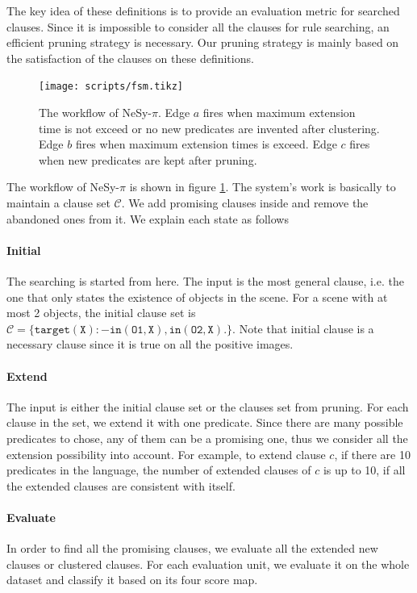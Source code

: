 \documentclass[
]{ceurart}
\begin{document}
The key idea of these definitions is to provide an evaluation metric for searched clauses. Since it is impossible to consider all the clauses for rule searching, an efficient pruning strategy is necessary. Our pruning strategy is mainly based on the satisfaction of the clauses on these definitions. 

\begin{figure}[h]
	\centering
	\texttt{[image: scripts/fsm.tikz]}
	\caption{The workflow of NeSy-$ \pi $. Edge $ a $ fires when maximum extension time is not exceed or no new predicates are invented after clustering. Edge $ b $ fires when maximum extension times is exceed. Edge $ c $ fires when new predicates are kept after pruning.}
	\label{fig:nesy-pi-workflow.}
\end{figure}

The workflow of NeSy-$ \pi $ is shown in figure \ref{fig:nesy-pi-workflow.}. The system's work is basically to maintain a clause set $ \mathcal{C} $. We add promising clauses inside and remove the abandoned ones from it. We explain each state as follows
\paragraph{Initial}
The searching is started from here. The input is the most general clause, i.e. the one that only states the existence of objects in the scene. For a scene with at most 2 objects, the initial clause set is $ \mathcal{C} = \{\mathtt{target(X):-in(O1,X),in(O2,X).} \} $. Note that initial clause is a necessary clause since it is true on all the positive images.

\paragraph{Extend}
The input is either the initial clause set or the clauses set from pruning. For each clause in the set, we extend it with one predicate. Since there are many possible predicates to chose, any of them can be a promising one, thus we consider all the extension possibility into account. For example, to extend clause $ c $, if there are 10 predicates in the language, the number of extended clauses of $ c $ is up to 10, if all the extended clauses are consistent with itself.

\paragraph{Evaluate}
In order to find all the promising clauses, we evaluate all the extended new clauses or clustered clauses. For each evaluation unit, we evaluate it on the whole dataset and classify it based on its four score map.
\end{document}
